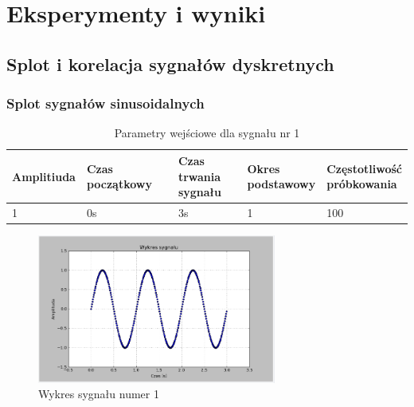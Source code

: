 \documentclass{article}
\begin{document}
\section{Eksperymenty i wyniki} {
    \subsection{Splot i korelacja sygnałów dyskretnych} 
    \subsubsection{Splot sygnałów sinusoidalnych} \label{eksperyment:splot1}{

                \begin{table}[h!]
                    \centering
                    \begin{tabular}{|l|l|l|l|l|}
                        \hline
                        Amplitiuda & Czas początkowy & \shortstack{Czas trwania \\ sygnału} & \shortstack{Okres \\ podstawowy} & \shortstack{Częstotliwość\\ próbkowania}   \\ \hline
                        1 & 0s & 3s & 1 & 100           \\ \hline
                    \end{tabular}
                    \caption{Parametry wejściowe dla sygnału nr 1}
                \end{table}
                \begin{figure}[h!]
                    \centering
                    \includegraphics[width=0.7\textwidth]{img/splot1.png}
                    \caption{Wykres sygnału numer 1}
                \end{figure}

}}
\end{document}
